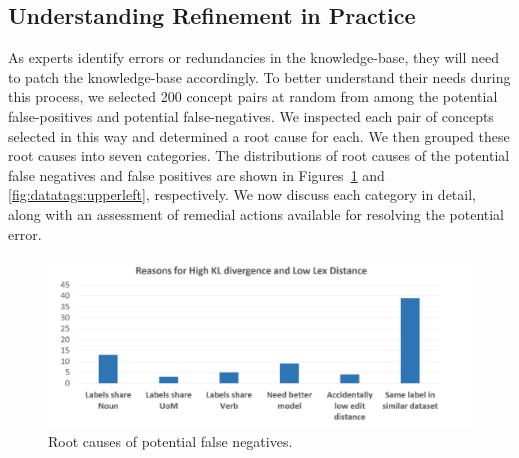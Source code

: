 


\subsection{Understanding Refinement in Practice}
As experts identify errors or redundancies in the knowledge-base, they will need to patch the knowledge-base accordingly.
To better understand their needs during this process, we selected 200 concept pairs at random from among the potential false-positives and potential false-negatives.
We inspected each pair of concepts selected in this way and determined a root cause for each.
We then grouped these root causes into seven categories.
The distributions of root causes of the potential false negatives and false positives are shown in Figures~\ref{fig:datatags:lowerright} and \ref{fig:datatags:upperleft}, respectively.
We now discuss each category in detail, along with an assessment of remedial actions available for resolving the potential error.

\begin{figure}
	\centering
	\includegraphics[width=\columnwidth]{graphics/Lower_right_quad}
	\caption{Root causes of potential false negatives.}
	\label{fig:datatags:lowerright}
	\trimfigurespacing
\end{figure}

